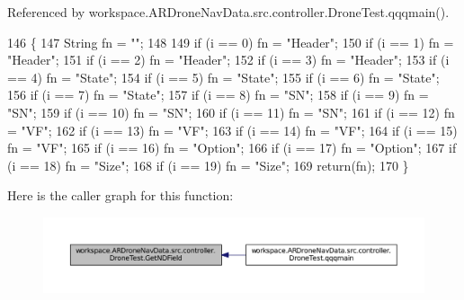 Referenced by workspace.\+A\+R\+Drone\+Nav\+Data.\+src.\+controller.\+Drone\+Test.\+qqqmain().


\begin{DoxyCode}
146     \{
147         String fn = \textcolor{stringliteral}{""};
148         
149         \textcolor{keywordflow}{if} (i == 0) fn = \textcolor{stringliteral}{"Header"};
150         \textcolor{keywordflow}{if} (i == 1) fn = \textcolor{stringliteral}{"Header"};
151         \textcolor{keywordflow}{if} (i == 2) fn = \textcolor{stringliteral}{"Header"};
152         \textcolor{keywordflow}{if} (i == 3) fn = \textcolor{stringliteral}{"Header"};
153         \textcolor{keywordflow}{if} (i == 4) fn = \textcolor{stringliteral}{"State"};
154         \textcolor{keywordflow}{if} (i == 5) fn = \textcolor{stringliteral}{"State"};
155         \textcolor{keywordflow}{if} (i == 6) fn = \textcolor{stringliteral}{"State"};
156         \textcolor{keywordflow}{if} (i == 7) fn = \textcolor{stringliteral}{"State"};
157         \textcolor{keywordflow}{if} (i == 8) fn = \textcolor{stringliteral}{"SN"};
158         \textcolor{keywordflow}{if} (i == 9) fn = \textcolor{stringliteral}{"SN"};
159         \textcolor{keywordflow}{if} (i == 10) fn = \textcolor{stringliteral}{"SN"};
160         \textcolor{keywordflow}{if} (i == 11) fn = \textcolor{stringliteral}{"SN"};
161         \textcolor{keywordflow}{if} (i == 12) fn = \textcolor{stringliteral}{"VF"};
162         \textcolor{keywordflow}{if} (i == 13) fn = \textcolor{stringliteral}{"VF"};
163         \textcolor{keywordflow}{if} (i == 14) fn = \textcolor{stringliteral}{"VF"};
164         \textcolor{keywordflow}{if} (i == 15) fn = \textcolor{stringliteral}{"VF"};
165         \textcolor{keywordflow}{if} (i == 16) fn = \textcolor{stringliteral}{"Option"};
166         \textcolor{keywordflow}{if} (i == 17) fn = \textcolor{stringliteral}{"Option"};
167         \textcolor{keywordflow}{if} (i == 18) fn = \textcolor{stringliteral}{"Size"};
168         \textcolor{keywordflow}{if} (i == 19) fn = \textcolor{stringliteral}{"Size"};
169         \textcolor{keywordflow}{return}(fn);
170     \}
\end{DoxyCode}


Here is the caller graph for this function\+:\nopagebreak
\begin{figure}[H]
\begin{center}
\leavevmode
\includegraphics[width=350pt]{classworkspace_1_1_a_r_drone_nav_data_1_1src_1_1controller_1_1_drone_test_ada5828711806780c8117e59dbdd5f3db_icgraph}
\end{center}
\end{figure}


